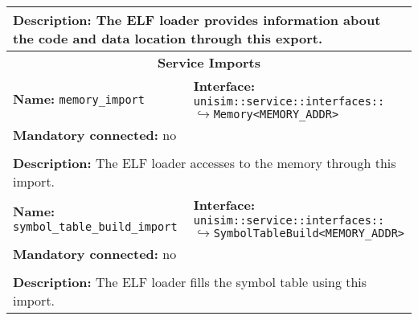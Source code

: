\begin{center}
\begin{tabular}{|p{7.5cm}|p{7.5cm}|}
		\multicolumn{2}{|p{15cm}|}{\textbf{Description:} \newline The ELF loader provides information about the code and data location through this export.}\\
		\hline
		\hline
		\multicolumn{2}{|c|}{\textbf{\large Service Imports}}\\
		\hline
		\multicolumn{1}{|p{7.5cm}}{\textbf{Name:} \texttt{memory\_import}} & \multicolumn{1}{p{7.5cm}|}{\textbf{Interface:} \newline \texttt{unisim::service::interfaces::} \newline$\hookrightarrow$\texttt{Memory<MEMORY\_ADDR>}}\\
		\multicolumn{2}{|p{15cm}|}{\textbf{Mandatory connected:} no}\\
		\multicolumn{2}{|l|}{}\\
		\multicolumn{2}{|p{15cm}|}{\textbf{Description:} \newline The ELF loader accesses to the memory through this import.}\\
		\hline
		\multicolumn{1}{|p{7.5cm}}{\textbf{Name:} \texttt{symbol\_table\_build\_import}} & \multicolumn{1}{p{7.5cm}|}{\textbf{Interface:} \newline \texttt{unisim::service::interfaces::} \newline$\hookrightarrow$\texttt{SymbolTableBuild<MEMORY\_ADDR>}}\\
		\multicolumn{2}{|p{15cm}|}{\textbf{Mandatory connected:} no}\\
		\multicolumn{2}{|l|}{}\\
		\multicolumn{2}{|p{15cm}|}{\textbf{Description:} \newline The ELF loader fills the symbol table using this import.}\\
		\hline
	\end{tabular}
\end{center}

